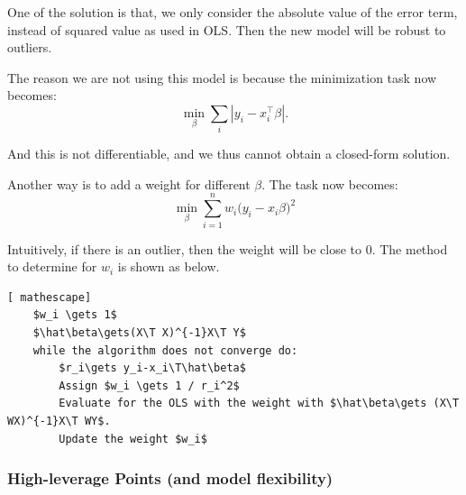 \documentclass{article}
\theoremstyle{MyNonumberplain}
\theoremstyle{break}
\newcommand{\T}{^\intercal}
\theoremstyle{break}
\begin{document}
\begin{center}
\end{center}
    
One of the solution is that, we only consider the absolute value of the error term, instead of squared value as used in OLS.
Then the new model will be robust to outliers.

The reason we are not using this model is because the minimization task now becomes:
$$\min_\beta\sum_i|y_i-x_i\T\beta|.$$

And this is not differentiable, and we thus cannot obtain a closed-form solution. 

Another way is to add a weight for different $\beta$. The task now becomes:
$$\min_\beta\sum_{i=1}^nw_i\bigl(y_i-x_i\beta\bigr)^2$$

Intuitively, if there is an outlier, then the weight will be close to 0. The method to determine for $w_i$ is shown as below.

\begin{lstlisting}[ mathescape]
    $w_i \gets 1$
    $\hat\beta\gets(X\T X)^{-1}X\T Y$
    while the algorithm does not converge do:
        $r_i\gets y_i-x_i\T\hat\beta$
        Assign $w_i \gets 1 / r_i^2$
        Evaluate for the OLS with the weight with $\hat\beta\gets (X\T WX)^{-1}X\T WY$.
        Update the weight $w_i$
\end{lstlisting}

\subsubsection{High-leverage Points (and model flexibility)}
\end{document}
